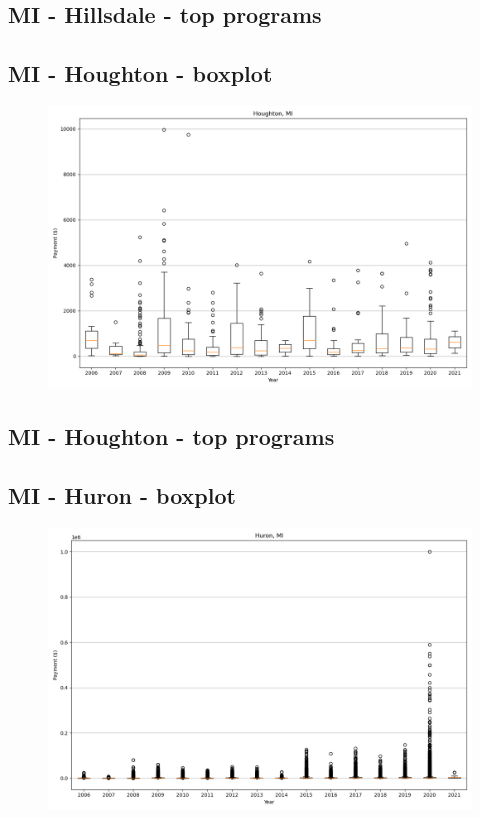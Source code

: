 \subsection*{MI - Hillsdale - top programs}

\newpage
\subsection*{MI - Houghton - boxplot}
\begin{figure}[h]
\centering
\includegraphics[width=7in]{../output/boxplots/counties/Houghton-MI_boxplot.png}
\end{figure}


\subsection*{MI - Houghton - top programs}

\newpage
\subsection*{MI - Huron - boxplot}
\begin{figure}[h]
\centering
\includegraphics[width=7in]{../output/boxplots/counties/Huron-MI_boxplot.png}
\end{figure}


